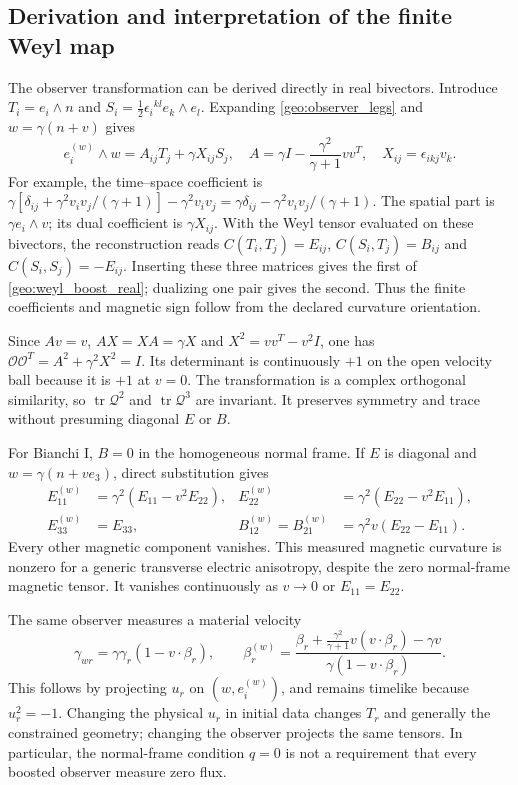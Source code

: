 \subsection{Derivation and interpretation of the finite Weyl map}
\label{geo:weyl_boost_derivation}
The observer transformation can be derived directly in real bivectors. Introduce $T_i=e_i\wedge n$ and $S_i=\frac12\epsilon_i{}^{kl}e_k\wedge e_l$. Expanding \eqref{geo:observer_legs} and $w=\gamma(n+v)$ gives
\begin{equation}
 e_i^{(w)}\wedge w=A_{ij}T_j+\gamma X_{ij}S_j,
 \quad A=\gamma I-\frac{\gamma^2}{\gamma+1}vv^T,
 \quad X_{ij}=\epsilon_{ikj}v_k.
 \label{geo:bivector_boost}
\end{equation}
For example, the time--space coefficient is
$\gamma[\delta_{ij}+\gamma^2v_iv_j/(\gamma+1)]-\gamma^2v_iv_j
=\gamma\delta_{ij}-\gamma^2v_iv_j/(\gamma+1)$.
The spatial part is $\gamma e_i\wedge v$; its dual coefficient is $\gamma X_{ij}$. With the Weyl tensor evaluated on these bivectors, the reconstruction reads
$C(T_i,T_j)=E_{ij}$, $C(S_i,T_j)=B_{ij}$ and $C(S_i,S_j)=-E_{ij}$.
Inserting these three matrices gives the first of \eqref{geo:weyl_boost_real}; dualizing one pair gives the second. Thus the finite coefficients and magnetic sign follow from the declared curvature orientation.

Since $Av=v$, $AX=XA=\gamma X$ and $X^2=vv^T-v^2I$, one has
$\mathcal O\mathcal O^T=A^2+\gamma^2X^2=I$. Its determinant is continuously $+1$ on the open velocity ball because it is $+1$ at $v=0$. The transformation is a complex orthogonal similarity, so $\operatorname{tr}\mathcal Q^2$ and $\operatorname{tr}\mathcal Q^3$ are invariant. It preserves symmetry and trace without presuming diagonal $E$ or $B$.

For Bianchi I, $B=0$ in the homogeneous normal frame. If $E$ is diagonal and $w=\gamma(n+ve_3)$, direct substitution gives
\begin{align}
 E_{11}^{(w)}&=\gamma^2(E_{11}-v^2E_{22}),&
 E_{22}^{(w)}&=\gamma^2(E_{22}-v^2E_{11}),\nonumber\\
 E_{33}^{(w)}&=E_{33},&
 B_{12}^{(w)}=B_{21}^{(w)}&=\gamma^2v(E_{22}-E_{11}).
 \label{geo:bianchiI_weyl_boost}
\end{align}
Every other magnetic component vanishes. This measured magnetic curvature is nonzero for a generic transverse electric anisotropy, despite the zero normal-frame magnetic tensor. It vanishes continuously as $v\to0$ or $E_{11}=E_{22}$.

The same observer measures a material velocity
\begin{equation}
 \gamma_{wr}=\gamma\gamma_r(1-v\cdot\beta_r),\qquad
 \beta_r^{(w)}=
 \frac{\beta_r+\frac{\gamma^2}{\gamma+1}v(v\cdot\beta_r)-\gamma v}
      {\gamma(1-v\cdot\beta_r)}.
 \label{geo:material_velocity_observer}
\end{equation}
This follows by projecting $u_r$ on $(w,e_i^{(w)})$, and remains timelike because $u_r^2=-1$. Changing the physical $u_r$ in initial data changes $T_r$ and generally the constrained geometry; changing the observer projects the same tensors. In particular, the normal-frame condition $q=0$ is not a requirement that every boosted observer measure zero flux.

